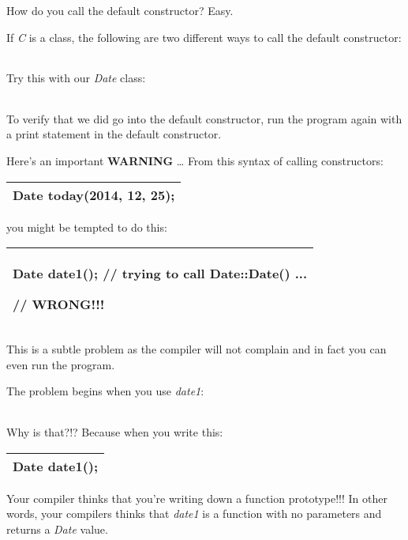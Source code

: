 \documentclass[
]{article}
\begin{document}
How do you call the default constructor? Easy.

If \emph{C} is a class, the following are two different ways to call the
default constructor:

\begin{longtable}[]{@{}@{}}
\toprule
\endhead
\bottomrule
\end{longtable}

Try this with our \emph{Date} class:

\begin{longtable}[]{@{}@{}}
\toprule
\endhead
\bottomrule
\end{longtable}

To verify that we did go into the default constructor, run the program
again with a print statement in the default constructor.

Here's an important \textbf{WARNING} \ldots{} From this syntax of
calling constructors:

\begin{longtable}[]{@{}l@{}}
\toprule
\endhead
Date today(2014, 12, 25);\tabularnewline
\bottomrule
\end{longtable}

you might be tempted to do this:

\begin{longtable}[]{@{}l@{}}
\toprule
\endhead
\begin{minipage}[t]{0.97\columnwidth}\raggedright
Date date1(); // trying to call Date::Date() ...

// WRONG!!!\strut
\end{minipage}\tabularnewline
\bottomrule
\end{longtable}

This is a subtle problem as the compiler will not complain and in fact
you can even run the program.

The problem begins when you use \emph{date1}:

\begin{longtable}[]{@{}@{}}
\toprule
\endhead
\bottomrule
\end{longtable}

Why is that?!? Because when you write this:

\begin{longtable}[]{@{}l@{}}
\toprule
\endhead
Date date1();\tabularnewline
\bottomrule
\end{longtable}

Your compiler thinks that you're writing down a function prototype!!! In
other words, your compilers thinks that \emph{date1} is a function with
no parameters and returns a \emph{Date} value.
\end{document}
